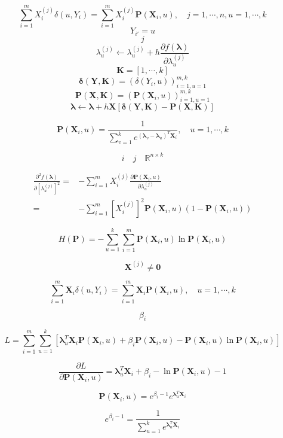 \documentclass[a4paper,12pt]{article}
\begin{document}
$$\sum_{i=1}^m X_i^{(j)}\delta(u,Y_i)=\sum_{i=1}^m X_i^{(j)}\textbf{P}(\textbf{X}_i,u),\quad j=1,\cdots,n,u=1,\cdots,k$$
$$Y_{i'}=u$$
$$j$$
$$\lambda_u^{(j)}\gets\lambda_u^{(j)}+h\frac{\partial f(\boldsymbol\lambda)}{\partial\lambda_u^{(j)}}$$
$$\textbf{K}=[1,\cdots,k]$$
$$\boldsymbol\delta(\textbf{Y},\textbf{K})=\left(\delta(Y_i,u)\right)_{i=1,u=1}^{m,k}$$
$$\textbf{P}(\textbf{X},\textbf{K})=\left(\textbf{P}(\textbf{X}_i,u)\right)_{i=1,u=1}^{m,k}$$
$$\boldsymbol\lambda\gets\boldsymbol\lambda+h\textbf{X}\left[\boldsymbol\delta(\textbf{Y},\textbf{K})-\textbf{P}(\textbf{X},\textbf{K})\right]$$

$$\textbf{P}(\textbf{X}_i,u)=\frac{1}{\sum_{v=1}^k e^{\left(\boldsymbol\lambda_v-\boldsymbol\lambda_u\right)^T\textbf{X}_i}},\quad u=1,\cdots,k$$

$$i\quad j\quad \mathbb{R}^{n\times k}$$

\begin{align}
\frac{\partial^2 f(\boldsymbol\lambda)}{\partial\left[\lambda_u^{(j)}\right]^2}=
&-\sum_{i=1}^m X_i^{(j)}\frac{\partial\textbf{P}(\textbf{X}_i,u)}{\partial\lambda_u^{(j)}}\\=
&-\sum_{i=1}^m\left[X_i^{(j)}\right]^2\textbf{P}(\textbf{X}_i,u)(1-\textbf{P}(\textbf{X}_i,u))
\end{align}

$$H(\textbf{P}) = -\sum_{u=1}^k\sum_{i=1}^m\textbf{P}(\textbf{X}_i,u)\ln\textbf{P}(\textbf{X}_i,u)$$

$$\textbf{X}^{(j)}\neq\textbf{0}$$

$$\sum_{i=1}^m \textbf{X}_i\delta(u,Y_i)=\sum_{i=1}^m\textbf{X}_i\textbf{P}(\textbf{X}_i,u),\quad u=1,\cdots,k$$

$$\beta_i$$

$$L=\sum_{i=1}^m\sum_{u=1}^k\left[\boldsymbol\lambda_u^T\textbf{X}_i\textbf{P}(\textbf{X}_i,u)+\beta_i\textbf{P}(\textbf{X}_i,u)-\textbf{P}(\textbf{X}_i,u)\ln\textbf{P}(\textbf{X}_i,u)\right]$$

$$\frac{\partial L}{\partial\textbf{P}(\textbf{X}_i,u)}=\boldsymbol\lambda_u^T\textbf{X}_i+\beta_i-\ln\textbf{P}(\textbf{X}_i,u)-1$$

$$\textbf{P}(\textbf{X}_i,u)=e^{\beta_i-1}e^{\boldsymbol\lambda_u^T\textbf{X}_i}$$

$$e^{\beta_i-1}=\frac{1}{\sum_{u=1}^ke^{\boldsymbol\lambda_u^T\textbf{X}_i}}$$
\end{document}
